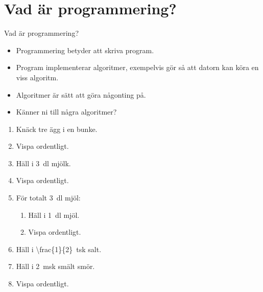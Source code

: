 \mode*

\begin{frame}
  \tableofcontents
\end{frame}

\section{Vad är programmering?}


\begin{frame}
  \begin{block}{Vad är programmering?}
    \begin{itemize}
      \item Programmering betyder att skriva program.
      \item Program implementerar algoritmer, exempelvis gör så att datorn kan 
        köra en viss algoritm.
      \item Algoritmer är sätt att göra någonting på.
    \end{itemize}
  \end{block}

  \pause

  \begin{exercise}
    \begin{itemize}
      \item Känner ni till några algoritmer?
    \end{itemize}
  \end{exercise}
\end{frame}

\begin{frame}
  \begin{example}
    \begin{enumerate}
      \item Knäck tre ägg i en bunke.
      \item Vispa ordentligt.
      \item Häll i \SI{3}{\deci\litre} mjölk.
      \item Vispa ordentligt.
      \item För totalt \SI{3}{\deci\litre} mjöl:
        \begin{enumerate}
          \item Häll i \SI{1}{\deci\litre} mjöl.
          \item Vispa ordentligt.
        \end{enumerate}
      \item Häll i \SI{\frac{1}{2}}{tsk} salt.
      \item Häll i \SI{2}{msk} smält smör.
      \item Vispa ordentligt.
    \end{enumerate}
  \end{example}
\end{frame}

